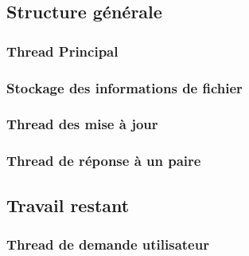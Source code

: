 \subsection{Structure générale}


%
%
%

\subsubsection{Thread Principal}
\subsubsection{Stockage des informations de fichier}
\subsubsection{Thread des mise à jour}
\subsubsection{Thread de réponse à un paire}

\subsection{Travail restant}
\subsubsection{Thread de demande utilisateur} 

